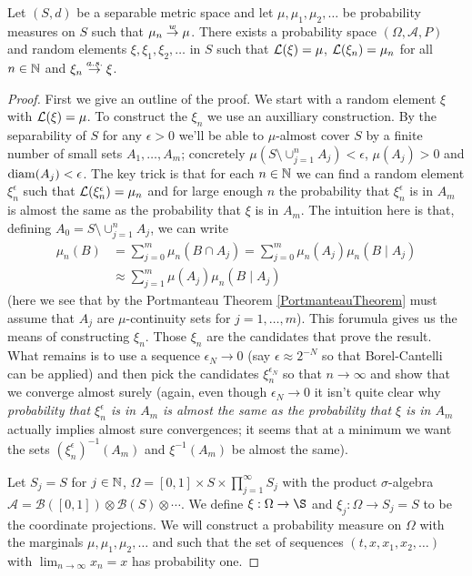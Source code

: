 \begin{thm}\label{SkorohodDudleyWichura}Let $(S,d)$ be a separable metric space and let $\mu, \mu_1, \mu_2, \dotsc$ be probability measures on $S$ such that $\mu_n \overset{w}\to \mu$.  There exists a probability space $(\Omega, \mathcal{A}, P)$ and random elements $\xi, \xi_1, \xi_2, \dotsc$ in $S$ such that $\mathcal{L}(\xi) = \mu$, $\mathcal{L}(\xi_n) = \mu_n$ for all $n \in \mathbb{N}$ and $\xi_n \overset{a.s.}\to \xi$.
\end{thm}
\begin{proof}
First we give an outline of the proof.  We start with a random element $\xi$ with $\mathcal{L}(\xi) = \mu$.  To construct the $\xi_n$ we use an auxilliary construction.  By the separability of $S$ for any $\epsilon>0$ we'll be able to $\mu$-almost cover $S$ by a finite number of small sets $A_1, \dotsc, A_m$; concretely $\mu\left(S \setminus \cup_{j=1}^n A_j \right) < \epsilon$, $\mu(A_j)>0$ and $\operatorname*{diam}(A_j) < \epsilon$.  The key trick is that for each $n \in \mathbb{N}$ we can find a random element $\xi^\epsilon_n$ such that $\mathcal{L}(\xi^\epsilon_n) = \mu_n$ and for large enough $n$ the probability that $\xi^\epsilon_n$ is in $A_m$ is almost the same as the probability that $\xi$ is in $A_m$.  The intuition here is that, defining $A_0 =  S \setminus \cup_{j=1}^n A_j$, we can write 
\begin{align*}
\mu_n(B) &= \sum_{j=0}^m \mu_n(B \cap A_j) = \sum_{j=0}^m \mu_n(A_j) \mu_n(B \mid A_j) \\
&\approx \sum_{j=1}^m \mu(A_j) \mu_n(B \mid A_j) 
\end{align*}  
(here we see that by the Portmanteau Theorem \ref{PortmanteauTheorem} must assume that $A_j$ are $\mu$-continuity sets for $j=1, \dotsc, m$).  This forumula gives us the means of constructing $\xi_n$.  
Those $\xi_n$ are the candidates that prove the result.  What remains is to use a sequence $\epsilon_N \to 0$ (say $\epsilon \approx 2^{-N}$ so that Borel-Cantelli can be applied) and then pick the candidates $\xi^{\epsilon_N}_n$ so that $n \to \infty$ and show that we converge almost surely (again, even though $\epsilon_N \to 0$ it isn't quite clear why \emph{probability that $\xi^\epsilon_n$ is in $A_m$ is almost the same as the probability that $\xi$ is in $A_m$} actually implies almost sure convergences; it seems that at a minimum we want the sets $(\xi^\epsilon_n)^{-1}(A_m)$ and $\xi^{-1}(A_m)$ be almost the same).

Let $S_j=S$ for $j \in \mathbb{N}$, $\Omega = [0,1] \times S \times \prod_{j=1}^\infty S_j$ with the product $\sigma$-algebra $\mathcal{A} = \mathcal{B}([0,1]) \otimes \mathcal{B}(S) \otimes \dotsb$.  We define $\xi : \Omega \to \S$ and $\xi_j : \Omega \to S_j = S$ to be the coordinate projections.  We will construct a probability measure on $\Omega$ with the marginals $\mu, \mu_1, \mu_2, \dotsc$ and such that the set of sequences $(t,x, x_1, x_2, \dotsc)$ with $\lim_{n \to \infty} x_n = x$ has probability one.


\end{proof}
